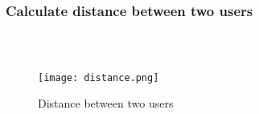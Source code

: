 \documentclass[12pt,a4paper]{article}
\begin{document}
\subsubsection{Calculate distance between two users}
\begin{lstlisting}
  


\end{lstlisting}
\begin{figure}[H]
    \centering
    \texttt{[image: distance.png]}
    \caption{Distance between two users}
    \label{fig:sample}
\end{figure}
\end{document}
